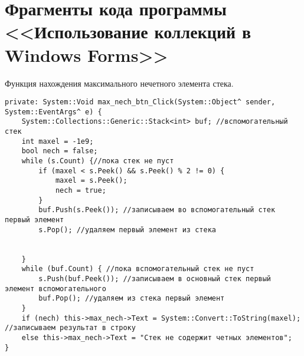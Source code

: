 \section{Фрагменты кода программы <<Использование коллекций в Windows Forms>>}
\label{app:collections}

Функция нахождения максимального нечетного элемента стека.
\begin{verbatim}
private: System::Void max_nech_btn_Click(System::Object^ sender, System::EventArgs^ e) {
	System::Collections::Generic::Stack<int> buf; //вспомогательный стек
	int maxel = -1e9;
	bool nech = false;
	while (s.Count) {//пока стек не пуст
		if (maxel < s.Peek() && s.Peek() % 2 != 0) {
			maxel = s.Peek();
			nech = true;
		} 
		buf.Push(s.Peek()); //записываем во вспомогательный стек первый элемент
		s.Pop(); //удаляем первый элемент из стека


	}
	while (buf.Count) { //пока вспомогательный стек не пуст
		s.Push(buf.Peek()); //записываем в основный стек первый элемент вспомогательного
		buf.Pop(); //удаляем из стека первый элемент
	}
	if (nech) this->max_nech->Text = System::Convert::ToString(maxel); //записываем результат в строку
	else this->max_nech->Text = "Стек не содержит четных элементов";
}
\end{verbatim}

